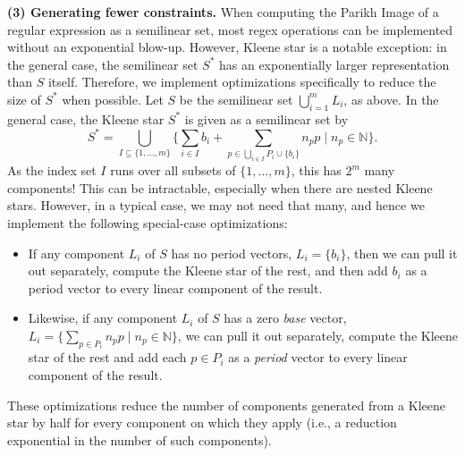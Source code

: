 \medskip
\noindent
\textbf{(3) Generating fewer constraints.}
When computing the Parikh Image of a regular expression as a semilinear set,
most regex operations can be implemented without an exponential blow-up.
However, Kleene star is a notable exception: in the general case, the
semilinear set $S^\ast$ has an exponentially larger representation than $S$
itself.  Therefore, we implement optimizations specifically to reduce the size
of $S^\ast$ when possible.
%
Let $S$ be the semilinear set $\bigcup_{i=1}^m L_i$, as above.
In the general case, the Kleene star $S^\ast$ is given as a semilinear set by
\[
  S^\ast=\bigcup_{I \subseteq \{1,...,m\}} \Big\{
    \sum_{i \in I} b_i
    + \sum_{p \in \bigcup_{i \in I} P_i\cup \{b_i\}} n_p p \;\Big\vert\; n_p \in \mathbb N \Big\}.
\]
As the index set $I$ runs over all subsets of $\{1,...,m\}$, this has $2^m$
many components! This can be intractable, especially when there are nested
Kleene stars. However, in a typical case, we may not need that many, and hence we
implement the following special-case optimizations:
\begin{itemize}
  \item If any component $L_i$ of $S$ has no period vectors, $L_i = \{b_i\}$, then we can pull it out separately, compute the Kleene star of the rest, and then add $b_i$ as a period vector to every linear component of the result.

  \item Likewise, if any component $L_i$ of $S$ has a zero \emph{base} vector,
    $L_i = \{ \sum_{p \in P_i} n_p p \mid n_p \in \mathbb N\}$,
    we can pull it out separately, compute the Kleene star of the rest and add each $p \in P_i$ as a \textit{period} vector to every linear component of the result.
\end{itemize}
These optimizations reduce the number of components generated from a Kleene star by
half for every component on which they apply (i.e., a reduction exponential in the number of such components).

